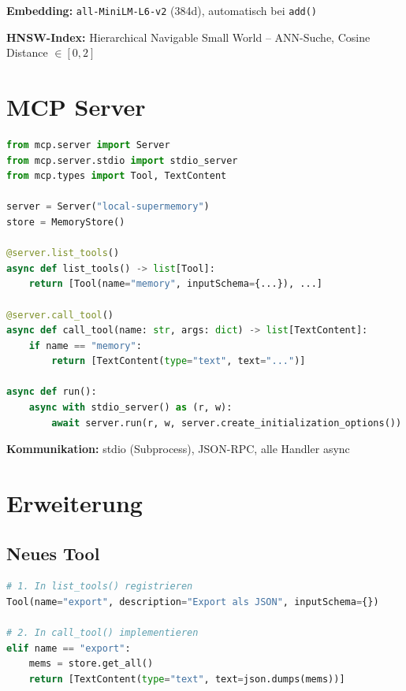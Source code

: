 \documentclass[11pt,a4paper]{article}
\begin{document}
\textbf{Embedding:} \texttt{all-MiniLM-L6-v2} (384d), automatisch bei \texttt{add()}

\textbf{HNSW-Index:} Hierarchical Navigable Small World -- ANN-Suche, Cosine Distance $\in [0,2]$


\section{MCP Server}

\begin{lstlisting}[style=code,language=Python,caption={server.py Struktur}]
from mcp.server import Server
from mcp.server.stdio import stdio_server
from mcp.types import Tool, TextContent

server = Server("local-supermemory")
store = MemoryStore()

@server.list_tools()
async def list_tools() -> list[Tool]:
    return [Tool(name="memory", inputSchema={...}), ...]

@server.call_tool()
async def call_tool(name: str, args: dict) -> list[TextContent]:
    if name == "memory":
        return [TextContent(type="text", text="...")]

async def run():
    async with stdio_server() as (r, w):
        await server.run(r, w, server.create_initialization_options())
\end{lstlisting}

\textbf{Kommunikation:} stdio (Subprocess), JSON-RPC, alle Handler async

\section{Erweiterung}

\subsection{Neues Tool}

\begin{lstlisting}[style=code,language=Python]
# 1. In list_tools() registrieren
Tool(name="export", description="Export als JSON", inputSchema={})

# 2. In call_tool() implementieren
elif name == "export":
    mems = store.get_all()
    return [TextContent(type="text", text=json.dumps(mems))]
\end{lstlisting}
\end{document}

